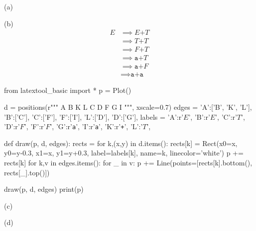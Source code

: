 
(a)

(b)
\begin{align*}
  E &\implies E \texttt{+} T \\
  &\implies T \texttt{+} T \\
  &\implies F \texttt{+} T \\
  &\implies \texttt{a+} T \\
  &\implies \texttt{a+} F \\
  &\implies \texttt{a+a}
\end{align*}

\begin{python}
from latextool_basic import *
p = Plot()

d = positions(r"""
     A
   B K L
   C   D 
   F   G 
   I
""", xscale=0.7)
edges = {'A':['B', 'K', 'L'],
  'B':['C'],
  'C':['F'],
  'F':['I'],
  'L':['D'],
  'D':['G'],
  }
labels = {'A':r'$E$',
  'B':r'$E$',
  'C':r'$T$',
  'D':r'$F$',
  'F':r'$F$',
  'G':r'\texttt{a}',
  'I':r'\texttt{a}',
  'K':r'\texttt{+}',
  'L':'$T$',
}

def draw(p, d, edges):
    rects = {}
    for k,(x,y) in d.items():
        rects[k] = Rect(x0=x, y0=y-0.3, x1=x, y1=y+0.3, label=labels[k],
                        name=k, linecolor='white')
        p += rects[k]
    for k,v in edges.items():
        for _ in v:
            p += Line(points=[rects[k].bottom(), rects[_].top()])

draw(p, d, edges)
print(p)
\end{python}

(c)

(d)
